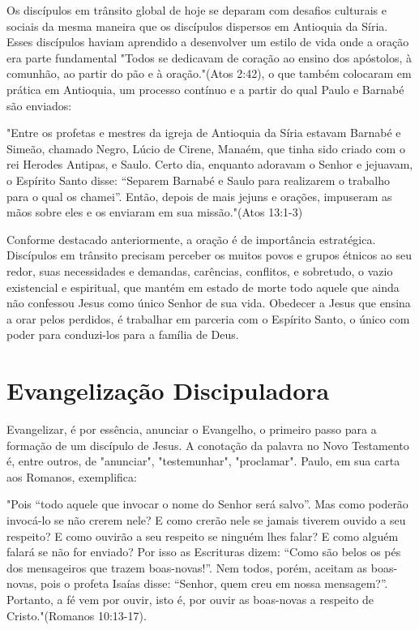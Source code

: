 \documentclass[12pt,openright,oneside,a4paper]{abntex2}
\begin{document}
Os discípulos em trânsito global de hoje se deparam com desafios culturais e sociais da mesma maneira que os discípulos dispersos em Antioquia da Síria. Esses discípulos haviam aprendido a desenvolver um estilo de vida onde a oração era parte fundamental "Todos se dedicavam de coração ao ensino dos apóstolos, à comunhão, ao partir do pão e à oração."(Atos 2:42), o que também colocaram em prática em Antioquia, um processo contínuo e a partir do qual Paulo e Barnabé são enviados: \begin{citacao}"Entre os profetas e mestres da igreja de Antioquia da Síria estavam Barnabé e Simeão, chamado Negro, Lúcio de Cirene, Manaém, que tinha sido criado com o rei Herodes Antipas, e Saulo. Certo dia, enquanto adoravam o Senhor e jejuavam, o Espírito Santo disse: “Separem Barnabé e Saulo para realizarem o trabalho para o qual os chamei”. Então, depois de mais jejuns e orações, impuseram as mãos sobre eles e os enviaram em sua missão."(Atos 13:1-3)\end{citacao}

Conforme destacado anteriormente, a oração é de importância estratégica. Discípulos em trânsito precisam perceber os muitos povos e grupos étnicos ao seu redor, suas necessidades e demandas, carências, conflitos, e sobretudo, o vazio existencial e espiritual, que mantém em estado de morte todo aquele que ainda não confessou Jesus como único Senhor de sua vida. Obedecer a Jesus que ensina a orar pelos perdidos, é trabalhar em parceria com o Espírito Santo, o único com poder para conduzi-los para a família de Deus. 

\section{Evangelização Discipuladora}

Evangelizar, é por essência, anunciar o Evangelho, o primeiro passo para a formação de um discípulo de Jesus. A conotação da palavra no Novo Testamento é, entre outros, de "anunciar", "testemunhar", "proclamar"\cite[p. 54]{brandao}. Paulo, em sua carta aos Romanos, exemplifica: \begin{citacao}"Pois “todo aquele que invocar o nome do Senhor será salvo”. Mas como poderão invocá-lo se não crerem nele? E como crerão nele se jamais tiverem ouvido a seu respeito? E como ouvirão a seu respeito se ninguém lhes falar? E como alguém falará se não for enviado? Por isso as Escrituras dizem: “Como são belos os pés dos mensageiros que trazem boas-novas!”. Nem todos, porém, aceitam as boas-novas, pois o profeta Isaías disse: “Senhor, quem creu em nossa mensagem?”. Portanto, a fé vem por ouvir, isto é, por ouvir as boas-novas a respeito de Cristo."(Romanos 10:13-17).\end{citacao}
\end{document}
